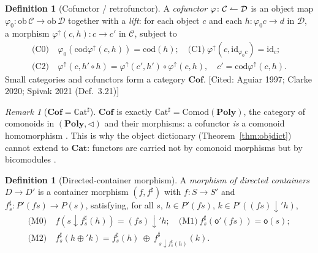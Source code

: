 \documentclass[11pt,a4paper]{book}
\newcommand{\Cat}{\mathbf{Cat}}
\newcommand{\Cof}{\mathbf{Cof}}
\newcommand{\Poly}{\mathbf{Poly}}
\newcommand{\id}{\mathrm{id}}
\newcommand{\cod}{\mathrm{cod}}
\newcommand{\ob}{\mathrm{ob}\,}
\newcommand{\co}{\mathrel{\text{\reflectbox{$\rightharpoonup$}}}}
\newcommand{\Cathash}{\mathbb{C}\mathrm{at}^\sharp}
\theoremstyle{plain}
\theoremstyle{definition}
\newtheorem{Definition}[Theorem]{Definition}
\theoremstyle{remark}
\newtheorem{Remark}[Theorem]{Remark}
\newcommand{\prov}[1]{\hfill\textsf{\footnotesize[#1]}}
\begin{document}
\begin{Definition}[Cofunctor / retrofunctor]\label{def:cofunctor}
A \emph{cofunctor} $\varphi\colon\mathcal C\co\mathcal D$ is an object map
$\varphi_0\colon\ob\mathcal C\to\ob\mathcal D$ together with a \emph{lift}: for each
object $c$ and each $h\colon\varphi_0 c\to d$ in $\mathcal D$, a morphism
$\varphi^\uparrow(c,h)\colon c\to c'$ in $\mathcal C$, subject to
\begin{align*}
  \text{(C0)}\ & \varphi_0(\cod\varphi^\uparrow(c,h))=\cod(h);\quad
  \text{(C1)}\ \varphi^\uparrow(c,\id_{\varphi_0 c})=\id_c;\\
  \text{(C2)}\ & \varphi^\uparrow(c,h'\circ h)=\varphi^\uparrow(c',h')\circ
        \varphi^\uparrow(c,h),\quad c'=\cod\varphi^\uparrow(c,h).
\end{align*}
Small categories and cofunctors form a category $\Cof$.
\prov{Cited: Aguiar 1997; Clarke 2020; Spivak 2021 (Def.\ 3.21)}
\end{Definition}

\begin{Remark}[$\Cof=\Cathash$]
$\Cof$ is exactly $\Cathash=\mathrm{Comod}(\Poly)$, the category of comonoids in
$(\Poly,\triangleleft)$ and their morphisms: a cofunctor \emph{is} a comonoid
homomorphism \cite{Spivak21,SS2405}. This is why the object dictionary
(Theorem~\ref{thm:objdict}) cannot extend to $\Cat$: functors are carried not by
comonoid morphisms but by bicomodules \cite{SS23}.
\end{Remark}

\begin{Definition}[Directed-container morphism]\label{def:dcm}
A \emph{morphism of directed containers} $D\to D'$ is a container morphism
$(f,f^\sharp)$ with $f\colon S\to S'$ and $f^\sharp_s\colon P'(fs)\to P(s)$,
satisfying, for all $s$, $h\in P'(fs)$, $k\in P'((fs)\downarrow' h)$,
\begin{align*}
  \text{(M0)}\ & f(s\downarrow f^\sharp_s(h))=(fs)\downarrow' h;\quad
  \text{(M1)}\ f^\sharp_s(\mathsf o'(fs))=\mathsf o(s);\\
  \text{(M2)}\ & f^\sharp_s(h\oplus' k)=
        f^\sharp_s(h)\ \oplus\ f^\sharp_{\,s\downarrow f^\sharp_s(h)}(k).
\end{align*}
\end{Definition}
\end{document}
